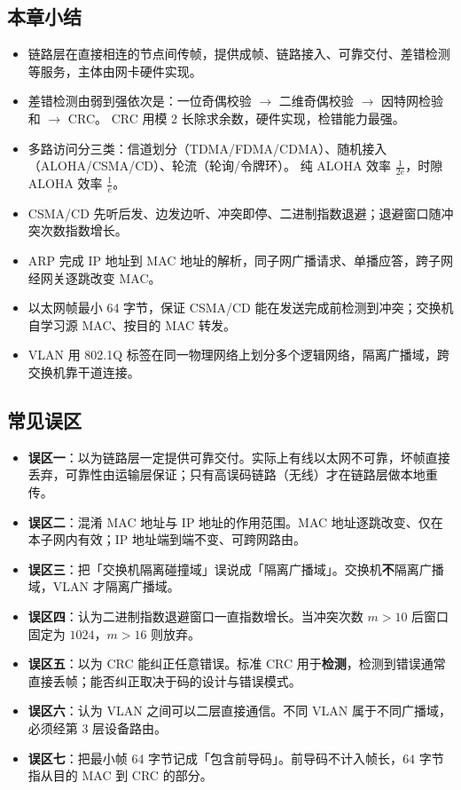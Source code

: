\subsection{本章小结}

\begin{itemize}
    \item 链路层在直接相连的节点间传帧，提供成帧、链路接入、可靠交付、差错检测等服务，主体由网卡硬件实现。
    \item 差错检测由弱到强依次是：一位奇偶校验 $\to$ 二维奇偶校验 $\to$ 因特网检验和 $\to$ CRC。
        CRC 用模 2 长除求余数，硬件实现，检错能力最强。
    \item 多路访问分三类：信道划分（TDMA/FDMA/CDMA）、随机接入（ALOHA/CSMA/CD）、轮流（轮询/令牌环）。
        纯 ALOHA 效率 $\frac{1}{2e}$，时隙 ALOHA 效率 $\frac{1}{e}$。
    \item CSMA/CD 先听后发、边发边听、冲突即停、二进制指数退避；退避窗口随冲突次数指数增长。
    \item ARP 完成 IP 地址到 MAC 地址的解析，同子网广播请求、单播应答，跨子网经网关逐跳改变 MAC。
    \item 以太网帧最小 64 字节，保证 CSMA/CD 能在发送完成前检测到冲突；交换机自学习源 MAC、按目的 MAC 转发。
    \item VLAN 用 802.1Q 标签在同一物理网络上划分多个逻辑网络，隔离广播域，跨交换机靠干道连接。
\end{itemize}

\subsection{常见误区}

\begin{itemize}
    \item \textbf{误区一}：以为链路层一定提供可靠交付。实际上有线以太网不可靠，坏帧直接丢弃，可靠性由运输层保证；只有高误码链路（无线）才在链路层做本地重传。
    \item \textbf{误区二}：混淆 MAC 地址与 IP 地址的作用范围。MAC 地址逐跳改变、仅在本子网内有效；IP 地址端到端不变、可跨网路由。
    \item \textbf{误区三}：把「交换机隔离碰撞域」误说成「隔离广播域」。交换机\textbf{不}隔离广播域，VLAN 才隔离广播域。
    \item \textbf{误区四}：认为二进制指数退避窗口一直指数增长。当冲突次数 $m>10$ 后窗口固定为 $1024$，$m>16$ 则放弃。
    \item \textbf{误区五}：以为 CRC 能纠正任意错误。标准 CRC 用于\textbf{检测}，检测到错误通常直接丢帧；能否纠正取决于码的设计与错误模式。
    \item \textbf{误区六}：认为 VLAN 之间可以二层直接通信。不同 VLAN 属于不同广播域，必须经第 3 层设备路由。
    \item \textbf{误区七}：把最小帧 64 字节记成「包含前导码」。前导码不计入帧长，$64$ 字节指从目的 MAC 到 CRC 的部分。
\end{itemize}
